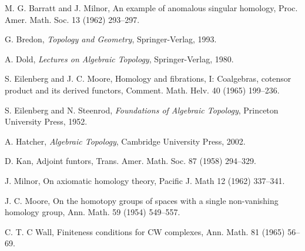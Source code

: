 \documentclass[11pt]{memoir}
\begin{document}
\nocite{*}
\begin{thebibliography}{9}

M. G. Barratt and J. Milnor,
An example of anomalous singular homology,
Proc. Amer. Math. Soc. 13 (1962) 293--297.

G. Bredon, {\em Topology and Geometry}, Springer-Verlag, 1993.

A. Dold,
{\em Lectures on Algebraic Topology},
Springer-Verlag, 1980.

S. Eilenberg and J. C. Moore, 
Homology and fibrations, I: Coalgebras, cotensor product and its 
derived functors,
Comment. Math. Helv. 40 (1965) 199--236.

S. Eilenberg and N. Steenrod,
{\em Foundations of Algebraic Topology},
Princeton University Press, 1952.

A. Hatcher,
{\em Algebraic Topology}, Cambridge University Press, 2002.

D. Kan,
Adjoint funtors,
Trans. Amer. Math. Soc. 87 (1958) 294--329.

J. Milnor,
On axiomatic homology theory,
Pacific J. Math 12 (1962) 337--341.

J. C. Moore, 
On the homotopy groups of spaces with a single non-vanishing homology group,
Ann. Math. 59 (1954) 549--557.

C. T. C Wall,
Finiteness conditions for CW complexes,
Ann. Math. 81 (1965) 56--69.

\end{thebibliography}
\end{document}
